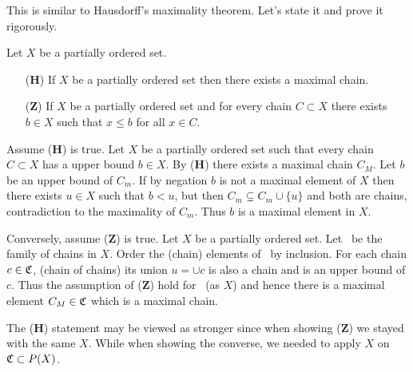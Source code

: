 This is similar to Hausdorff's maximality theorem.
Let's state it and prove it rigorously.

\begin{llem}
Let $X$ be a partially ordered set.
\begin{itemize}
 \item[(\textbf{H})]
 If $X$ be a partially ordered set then there exists a maximal chain.
 \item[(\textbf{Z})]
 If $X$ be a partially ordered set and for every chain \(C\subset X\)
 there exists \(b\in X\) such that \(x\leq b\) for all \(x\in C\).
\end{itemize}
\end{llem}
\begin{thmproof}
Assume (\textbf{H}) is true.
Let $X$ be a partially ordered set such that every chain \(C\subset X\)
has a upper bound \(b\in X\). By (\textbf{H}) there exists a maximal chain
\(C_M\). Let $b$ be an upper bound of \(C_m\). If by negation
$b$ is not a maximal element of $X$ then there exists \(u\in X\)
such that \(b<u\), but then \(C_m \subsetneq C_m \cup \{u\}\)
and both are chains, contradiction to the maximality of \(C_m\).
Thus $b$ is a maximal element in $X$.

Conversely, assume (\textbf{Z}) is true. Let $X$ be a partially ordered set.
Let \frakC\ be the family of chains in $X$.
Order the (chain) elements of \frakC\ by inclusion.
For each chain \(c \in \mathfrak{C}\),
(chain of chains) its union \(u = \cup c\) is also a chain and is
an upper bound of $c$. Thus the assumption of (\textbf{Z}) hold
for \frakC\ (as $X$)
and hence there is a maximal element \(C_M\in\mathfrak{C}\) which is a maximal chain.
\end{thmproof}

The (\textbf{H}) statement may be viewed as stronger since
when showing (\textbf{Z}) we stayed with the same $X$.
While when showing the converse, we needed to apply $X$
on \(\mathfrak{C}\subset P(X)\).


% 



\printindex


\closegraphsfile



